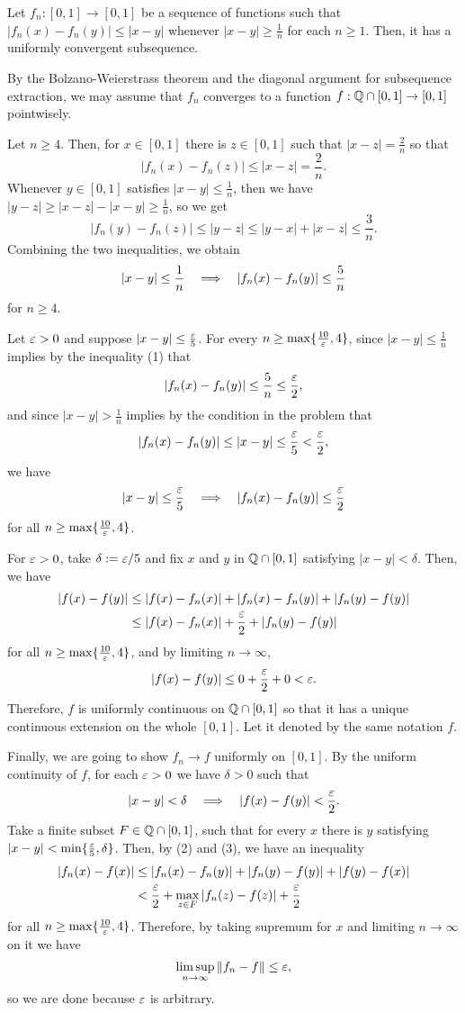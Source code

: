 \documentclass[a4paper]{article}
\begin{document}
\clearpage
\begin{prb}
Let $f_n:[0,1]\to[0,1]$ be a sequence of functions such that $|f_n(x)-f_n(y)|\le|x-y|$ whenever $|x-y|\ge\frac1n$ for each $n\ge1$.
Then, it has a uniformly convergent subsequence.
\end{prb}
\begin{sol}
By the Bolzano-Weierstrass theorem and the diagonal argument for subsequence extraction, we may assume that $f_n$ converges to a function $f:\mathbb{Q}\cap[0,1]\to[0,1]$ pointwisely.

Let $n\ge4$.
Then, for $x\in[0,1]$ there is $z\in[0,1]$ such that $|x-z|=\frac2n$ so that
\[|f_n(x)-f_n(z)|\le|x-z|=\frac2n.\]
Whenever $y\in[0,1]$ satisfies $|x-y|\le\frac1n$, then we have $|y-z|\ge|x-z|-|x-y|\ge\frac1n$, so we get
\[|f_n(y)-f_n(z)|\le|y-z|\le|y-x|+|x-z|\le\frac3n.\]
Combining the two inequalities, we obtain
\begin{align}|x-y|\le\frac1n\impl|f_n(x)-f_n(y)|\le\frac5n\end{align}
for $n\ge4$.

Let $\varepsilon>0$ and suppose $|x-y|\le\frac{\varepsilon}5$.
For every $n\ge\max\{\frac{10}{\varepsilon},4\}$, since $|x-y|\le\frac1n$ implies by the inequality (1) that
\[|f_n(x)-f_n(y)|\le\frac5n\le\frac{\varepsilon}2,\]
and since $|x-y|>\frac1n$ implies by the condition in the problem that
\[|f_n(x)-f_n(y)|\le|x-y|\le\frac{\varepsilon}5<\frac{\varepsilon}2,\]
we have
\begin{align}|x-y|\le\frac\e5\impl|f_n(x)-f_n(y)|\le\frac\e2\end{align}
for all $n\ge\max\{\frac{10}{\varepsilon},4\}$.

For $\varepsilon>0$, take $\delta:=\varepsilon/5$ and fix $x$ and $y$ in $\mathbb{Q}\cap[0,1]$ satisfying $|x-y|<\delta$.
Then, we have
\begin{align*}
|f(x)-f(y)|
&\le|f(x)-f_n(x)|+|f_n(x)-f_n(y)|+|f_n(y)-f(y)|\\
&\le|f(x)-f_n(x)|+\frac{\varepsilon}2+|f_n(y)-f(y)|
\end{align*}
for all $n\ge\max\{\frac{10}{\varepsilon},4\}$, and by limiting $n\to\infty$,
\[|f(x)-f(y)|\le0+\frac{\varepsilon}2+0<\varepsilon.\]
Therefore, $f$ is uniformly continuous on $\mathbb{Q}\cap[0,1]$ so that it has a unique continuous extension on the whole $[0,1]$.
Let it denoted by the same notation $f$.

Finally, we are going to show $f_n\to f$ uniformly on $[0,1]$.
By the uniform continuity of $f$, for each $\varepsilon>0$ we have $\delta>0$ such that
\begin{align}|x-y|<\delta\impl|f(x)-f(y)|<\frac\e2.\end{align}
Take a finite subset $F\in\mathbb{Q}\cap[0,1]$, such that for every $x$ there is $y$ satisfying $|x-y|<\min\{\frac{\varepsilon}5,\delta\}$.
Then, by (2) and (3), we have an inequality
\begin{align*}
|f_n(x)-f(x)|&\le|f_n(x)-f_n(y)|+|f_n(y)-f(y)|+|f(y)-f(x)|\\
&<\frac{\varepsilon}2+\max_{z\in F}|f_n(z)-f(z)|+\frac{\varepsilon}2
\end{align*}
for all $n\ge\max\{\frac{10}{\varepsilon},4\}$.
Therefore, by taking supremum for $x$ and limiting $n\to\infty$ on it we have
\[\limsup_{n\to\infty}\|f_n-f\|\le\varepsilon,\]
so we are done because $\varepsilon$ is arbitrary.
\end{sol}
\end{document}
